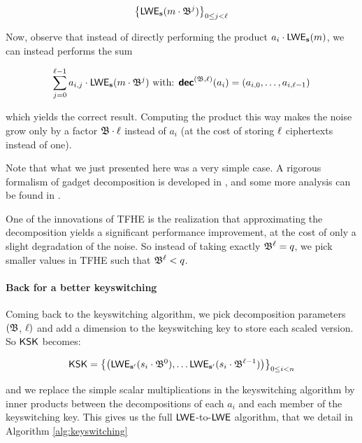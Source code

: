 \[
	\left \lbrace \textsf{LWE}_{\mathbf s}(m \cdot \mathfrak{B}^j) \right \rbrace_{0 \le j < \ell}
\]

Now, observe that instead of directly performing the product $a_i \cdot \textsf{LWE}_{\mathbf s}(m)$, we can instead performs the sum 

\[
	\sum_{j=0}^{\ell - 1} a_{i,j} \cdot \textsf{LWE}_{\mathbf s}(m \cdot \mathfrak{B}^j) \text{ with: } \textbf{\textsf{dec}}^{(\mathfrak{B}, \ell)}(a_i) = (a_{i, 0}, \dots, a_{i, \ell-1})
\]

which yields the correct result. Computing the product this way makes the noise grow only by a factor $\mathfrak{B} \cdot \ell$ instead of $a_i$ (at the cost of storing $\ell$ ciphertexts instead of one).



Note that what we just presented here was a very simple case. A rigorous formalism of gadget decomposition is developed in \cite{EC:GenMicPol19}, and some more analysis can be found in \cite{AC:Joye21}.


One of the innovations of TFHE is the realization that approximating the decomposition yields a significant performance improvement, at the cost of only a slight degradation of the noise. So instead of taking exactly $\mathfrak{B}^\ell = q$, we pick smaller values in TFHE such that $\mathfrak{B}^\ell < q$.


\paragraph{Back for a better keyswitching}

Coming back to the keyswitching algorithm, we pick decomposition parameters $(\mathfrak{B}$, $\ell)$ and add a dimension to the keyswitching key to store each scaled version. So $\textsf{KSK}$ becomes:

\[
	\textsf{KSK} = \left \lbrace \left ( \textsf{LWE}_{\mathbf s'} (s_i \cdot \mathfrak{B}^0), \dots  \textsf{LWE}_{\mathbf s'} (s_i \cdot \mathfrak{B}^{\ell-1}) \right ) \right \rbrace_{0 \le i < n}
\]


and we replace the simple scalar multiplications in the keyswitching algorithm by inner products between the decompositions of each $a_i$ and each member of the keyswitching key. This gives us the full $\textsf{LWE}$-to-$\textsf{LWE}$ algorithm, that we detail in Algorithm \ref{alg:keyswitching}



